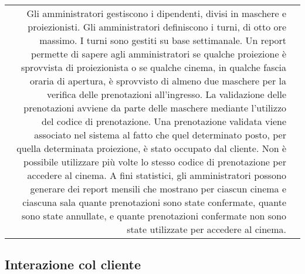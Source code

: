 \begin{tabularx}{\linewidth}{r|>{\internallinenumbers}X|}
      Gli amministratori gestiscono i dipendenti, divisi in maschere
      e proiezionisti. \hfill \linebreak
      Gli amministratori definiscono i turni, di otto ore massimo.
      I turni sono gestiti su base settimanale.
      Un report permette di sapere agli amministratori se qualche proiezione
      è sprovvista di proiezionista o se qualche cinema, in qualche
      fascia oraria di apertura, è sprovvisto di almeno due maschere per la
      verifica delle prenotazioni all’ingresso.
      \newline
      \newline
      La validazione delle prenotazioni avviene da parte delle maschere
      mediante l’utilizzo del codice di prenotazione.
      Una prenotazione validata viene associato nel sistema al fatto che quel
      determinato posto, per quella determinata proiezione, è stato occupato
      dal cliente.
      Non è possibile utilizzare più volte lo stesso codice di prenotazione
      per accedere al cinema.
      \newline
      \newline
      A fini statistici, gli amministratori possono generare dei report mensili
      che mostrano per ciascun cinema e ciascuna sala quante prenotazioni sono
      state confermate, quante sono state annullate, e quante prenotazioni
      confermate non sono state utilizzate per accedere al cinema.
      \\\cline{2-2}
\end{tabularx}

\pagebreak

\subsection*{Interazione col cliente}

